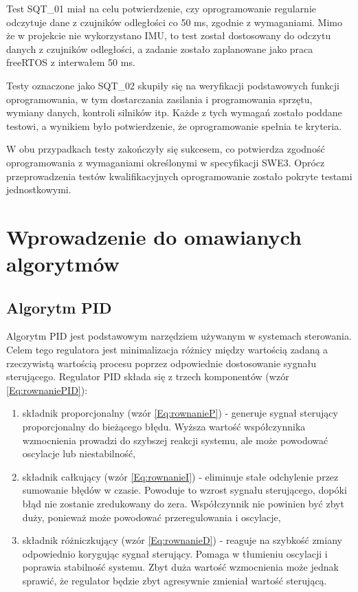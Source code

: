 \documentclass[12pt,twoside]{article}
\begin{document}
Test SQT\_01 miał na celu potwierdzenie, czy oprogramowanie regularnie odczytuje dane z czujników odległości co 50 ms, zgodnie z wymaganiami. Mimo że w projekcie nie wykorzystano IMU, to test został dostosowany do odczytu danych z czujników odległości, a zadanie zostało zaplanowane jako praca freeRTOS z interwałem 50 ms.

Testy oznaczone jako SQT\_02 skupiły się na weryfikacji podstawowych funkcji oprogramowania, w tym dostarczania zasilania i programowania sprzętu, wymiany danych, kontroli silników itp. Każde z tych wymagań zostało poddane testowi, a wynikiem było potwierdzenie, że oprogramowanie spełnia te kryteria.

W obu przypadkach testy zakończyły się sukcesem, co potwierdza zgodność oprogramowania z wymaganiami określonymi w specyfikacji SWE3. Oprócz przeprowadzenia testów kwalifikacyjnych oprogramowanie zostało pokryte testami jednostkowymi.

\section{Wprowadzenie do omawianych algorytmów}

\subsection{Algorytm PID}
Algorytm PID \cite{PID} jest podstawowym narzędziem używanym w systemach sterowania. Celem tego regulatora jest minimalizacja różnicy między wartością zadaną a rzeczywistą wartością procesu poprzez odpowiednie dostosowanie sygnału sterującego. Regulator PID składa się z trzech komponentów (wzór \ref{Eq:rownaniePID}):



\begin{enumerate}[label=\alph*), leftmargin=1.25cm]
	\item składnik proporcjonalny (wzór \ref{Eq:rownanieP}) - generuje sygnał sterujący proporcjonalny do bieżącego błędu. Wyższa wartość współczynnika wzmocnienia prowadzi do szybszej reakcji systemu, ale może powodować oscylacje lub niestabilność,
	
	\item składnik całkujący (wzór \ref{Eq:rownanieI}) - eliminuje stałe odchylenie przez sumowanie błędów w czasie. Powoduje to wzrost sygnału sterującego, dopóki błąd nie zostanie zredukowany do zera. Współczynnik nie powinien być zbyt duży, ponieważ może powodować przeregulowania i oscylacje,
	
	\item składnik różniczkujący (wzór \ref{Eq:rownanieD}) - reaguje na szybkość zmiany odpowiednio korygując sygnał sterujący. Pomaga w tłumieniu oscylacji i poprawia stabilność systemu. Zbyt duża wartość wzmocnienia może jednak sprawić, że regulator będzie zbyt agresywnie zmieniał wartość sterującą.
\end{enumerate}
\end{document}
